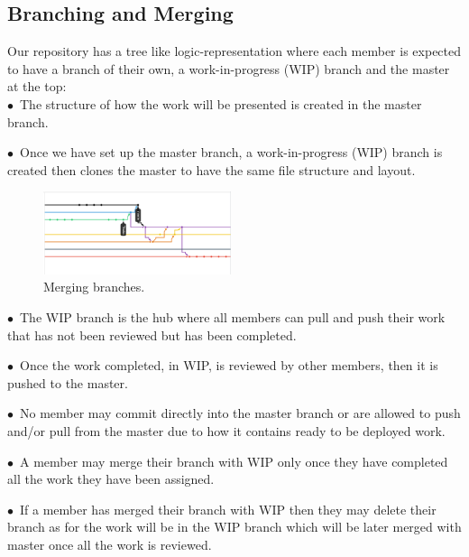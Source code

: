 \documentclass[english]{article}
\begin{document}
\subsection{Branching and Merging}		
Our repository has a tree like logic-representation where each member is expected to have a branch of their own, a work-in-progress (WIP) branch and the master at the top:\\
$\bullet$\ The structure of how the work will be presented is created in the master branch.\par
$\bullet$\ Once we have set up the master branch, a work-in-progress (WIP) branch is created then clones the master to have the same file structure and layout.\par 
\begin{figure}
	\caption{Merging branches.}
	\label{wrap-fig:8}
	\includegraphics[width=5.5cm]{images/merging.png}
\end{figure}
$\bullet$\ The WIP branch is the hub where all members can pull and push their work that has not been reviewed but has been completed.\par
$\bullet$\ Once the work completed, in WIP, is reviewed by other members, then it is pushed to the master.\par
$\bullet$\ No member may commit directly into the master branch or are allowed to push and/or pull from the master due to how it contains ready to be deployed work.\par 
$\bullet$\ A member may merge their branch with WIP only once they have completed all the work they have been assigned.\par
$\bullet$\ If a member has merged their branch with WIP then they may delete their branch as for the work will be in the WIP branch which will be later merged with master once all the work is reviewed. \par
\end{document}
